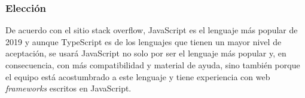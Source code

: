\subsubsection*{Elección}

De acuerdo con el sitio stack overflow\cite{noauthor_stack_nodate}, JavaScript es el lenguaje más popular de 2019 y aunque TypeScript es de los lenguajes que tienen un mayor nivel de aceptación, se usará JavaScript no solo por ser el lenguaje más popular y, en consecuencia, con más compatibilidad y material de ayuda, sino también porque el equipo está acostumbrado a este lenguaje y tiene experiencia con web \textit{frameworks} escritos en JavaScript.


